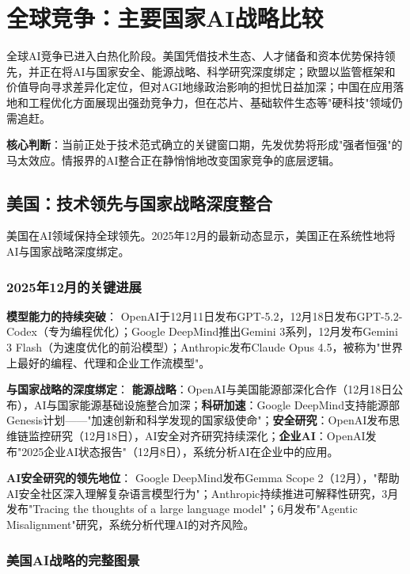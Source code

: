 \chapter{全球竞争：主要国家AI战略比较}

全球AI竞争已进入白热化阶段。美国凭借技术生态、人才储备和资本优势保持领先，并正在将AI与国家安全、能源战略、科学研究深度绑定；欧盟以监管框架和价值导向寻求差异化定位，但对AGI地缘政治影响的担忧日益加深；中国在应用落地和工程优化方面展现出强劲竞争力，但在芯片、基础软件生态等"硬科技"领域仍需追赶。

\textbf{核心判断}：当前正处于技术范式确立的关键窗口期，先发优势将形成"强者恒强"的马太效应。情报界的AI整合正在静悄悄地改变国家竞争的底层逻辑。

\section{美国：技术领先与国家战略深度整合}

美国在AI领域保持全球领先。2025年12月的最新动态显示，美国正在系统性地将AI与国家战略深度绑定。

\subsection{2025年12月的关键进展}

\textbf{模型能力的持续突破}：
OpenAI于12月11日发布GPT-5.2，12月18日发布GPT-5.2-Codex（专为编程优化）；Google DeepMind推出Gemini 3系列，12月发布Gemini 3 Flash（为速度优化的前沿模型）；Anthropic发布Claude Opus 4.5，被称为"世界上最好的编程、代理和企业工作流模型"。

\textbf{与国家战略的深度绑定}：
\textbf{能源战略}：OpenAI与美国能源部深化合作（12月18日公布），AI与国家能源基础设施整合加深；\textbf{科研加速}：Google DeepMind支持能源部Genesis计划——"加速创新和科学发现的国家级使命"；\textbf{安全研究}：OpenAI发布思维链监控研究（12月18日），AI安全对齐研究持续深化；\textbf{企业AI}：OpenAI发布"2025企业AI状态报告"（12月8日），系统分析AI在企业中的应用。

\textbf{AI安全研究的领先地位}：
Google DeepMind发布Gemma Scope 2（12月），"帮助AI安全社区深入理解复杂语言模型行为"；Anthropic持续推进可解释性研究，3月发布"Tracing the thoughts of a large language model"；6月发布"Agentic Misalignment"研究，系统分析代理AI的对齐风险。

\subsection{美国AI战略的完整图景}

